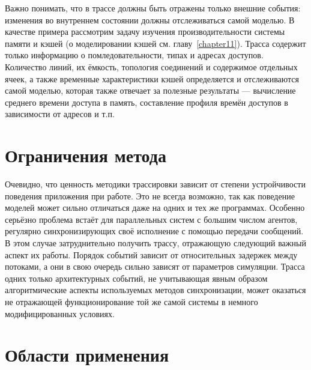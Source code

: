 Важно понимать, что в трассе должны быть отражены только внешние события: изменения во внутреннем состоянии должны отслеживаться самой моделью. В качестве примера рассмотрим задачу изучения производительности системы памяти и кэшей (о моделировании кэшей см. главу~\ref{chapter11}). Трасса содержит только информацию о помледовательности, типах и адресах доступов. Количество линий, их ёмкость, топология соединений и содержимое отдельных ячеек, а также временные характеристики кэшей определяется и отслеживаются самой моделью, которая также отвечает за полезные результаты --- вычисление среднего времени доступа в память, составление профиля времён доступов в зависимости от адресов и т.п.


\section{Ограничения метода}

Очевидно, что ценность методики трассировки зависит от степени устройчивости поведения приложения при работе. Это не всегда возможно, так как поведение моделей может сильно отличаться даже на одних и тех же программах. Особенно серьёзно проблема встаёт для параллельных систем с большим числом агентов, регулярно синхронизирующих своё исполнение с помощью передачи сообщений. В этом случае затруднительно получить трассу, отражающую следующий важный аспект их работы.  Порядок событий зависит от относительных задержек между потоками, а они в свою очередь сильно зависят от параметров симуляции. Трасса одних только архитектурных событий, не учитывающая явным образом алгоритмические аспекты используемых методов синхронизации, может оказаться не отражающей  функционирование той же самой системы в немного модифицированных условиях.

\section{Области применения}

